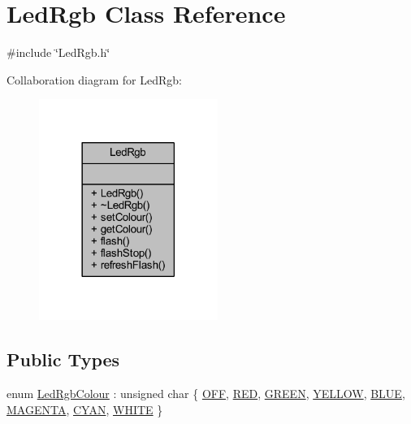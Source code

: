 \hypertarget{class_led_rgb}{}\section{Led\+Rgb Class Reference}
\label{class_led_rgb}


{\ttfamily \#include \char`\"{}Led\+Rgb.\+h\char`\"{}}



Collaboration diagram for Led\+Rgb\+:
\nopagebreak
\begin{figure}[H]
\begin{center}
\leavevmode
\includegraphics[width=165pt]{d7/d05/class_led_rgb__coll__graph}
\end{center}
\end{figure}
\subsection*{Public Types}
\begin{DoxyCompactItemize}
\item 
enum \hyperlink{class_led_rgb_af328c665510f921f0dfed643f939087b}{Led\+Rgb\+Colour} \+: unsigned char \{ \newline
\hyperlink{class_led_rgb_af328c665510f921f0dfed643f939087bafa756b630af74b887096f90549a19eb2}{O\+FF}, 
\hyperlink{class_led_rgb_af328c665510f921f0dfed643f939087bad4594f28e25fb32eabf7a9d648ba5486}{R\+ED}, 
\hyperlink{class_led_rgb_af328c665510f921f0dfed643f939087ba8cabace225f1edbe38153816b604671e}{G\+R\+E\+EN}, 
\hyperlink{class_led_rgb_af328c665510f921f0dfed643f939087ba72e005fe358740655546dd715d5b734d}{Y\+E\+L\+L\+OW}, 
\newline
\hyperlink{class_led_rgb_af328c665510f921f0dfed643f939087bae717dcfc60bfe087c8890aa0884b2eee}{B\+L\+UE}, 
\hyperlink{class_led_rgb_af328c665510f921f0dfed643f939087ba05943407d36a27b34f6c2e60290061f5}{M\+A\+G\+E\+N\+TA}, 
\hyperlink{class_led_rgb_af328c665510f921f0dfed643f939087ba1718c136915fce13ae47066acbe861ad}{C\+Y\+AN}, 
\hyperlink{class_led_rgb_af328c665510f921f0dfed643f939087ba00db6e86f434a54a72f54a0efab84aff}{W\+H\+I\+TE}
 \}
\end{DoxyCompactItemize}
